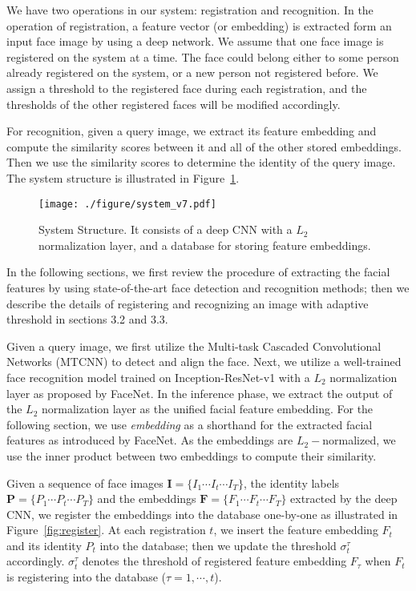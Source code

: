 \documentclass[10pt,twocolumn]{article}
\begin{document}
We have two operations in our system: registration and recognition. In the operation of registration, a feature vector (or embedding) is extracted form an input face image by using a deep network. We assume that one face image is registered on the system at a time. The face could belong either to some person already registered on the system, or a new person not registered before. 
We assign a threshold to the registered face during each registration, and the thresholds of the other registered faces will be modified accordingly.

For recognition, given a query image, we extract its feature embedding and compute the similarity scores between it and all of the other stored embeddings. Then we use the similarity scores to determine the identity of the query image.
The system structure is illustrated in Figure~\ref{fig:structure}.
\begin{figure}[t]
\centering
\texttt{[image: ./figure/system\_v7.pdf]}
\caption{System Structure. It consists of a deep CNN with a $L_2$ normalization layer, and a database for storing feature embeddings.}
\label{fig:structure}
\end{figure}

In the following sections, we first review the procedure of extracting the facial features by using state-of-the-art face detection and recognition methods; then we describe the details of registering and recognizing an image with adaptive threshold in sections 3.2 and 3.3.





Given a query image, we first utilize the Multi-task Cascaded Convolutional Networks (MTCNN)\cite{zhang2016joint} to detect and align the face.
Next, we utilize a well-trained face recognition model trained on Inception-ResNet-v1\cite{szegedy2017inception} with a $L_2$ normalization layer as proposed by FaceNet\cite{schroff2015facenet}. In the inference phase, we extract the output of the $L_2$ normalization layer as the unified facial feature embedding.
For the following section, we use \textit{embedding} as a shorthand for the extracted facial features as introduced by FaceNet.
As the embeddings are $L_2-$normalized, we use the inner product between two embeddings to compute their similarity.

Given a sequence of face images $\textbf{I}=\{I_{1} \cdots I_{t}\cdots I_{T}\}$, the identity labels $\textbf{P}=\{P_{1} \cdots P_{t} \cdots P_{T}\}$ and the embeddings $\textbf{F}=\{F_{1} \cdots F_{t} \cdots F_{T}\}$ extracted by the deep CNN, we register the embeddings into the database one-by-one as illustrated in Figure~\ref{fig:register}. At each registration $t$, we insert the feature embedding $F_{t}$ and its identity $P_{t}$ into the database; then we update the threshold $\sigma_{t}^{\tau}$ accordingly. $\sigma_{t}^{\tau}$ denotes the threshold of registered feature embedding $F_{\tau}$ when $F_{t}$ is registering into the database ($\tau = 1, \cdots, t$).
\end{document}

